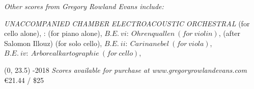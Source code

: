 \documentclass[10pt]{article}
\begin{document}
\begin{center}
\textit{\fontsize{.7cm}{1em}\selectfont Other scores from Gregory Rowland Evans include:} \hfill
\end{center}
\vspace*{4\baselineskip}
{
\begin{center}
\begin{paracol}{4}
\textit{\fontsize{.5cm}{1em}\selectfont UNACCOMPANIED}
\switchcolumn
\textit{\fontsize{.5cm}{1em}\selectfont CHAMBER}
\switchcolumn
\textit{\fontsize{.5cm}{1em}\selectfont ELECTROACOUSTIC}
\switchcolumn
\textit{\fontsize{.5cm}{1em}\selectfont ORCHESTRAL}
\switchcolumn
{} (for cello alone),
\switchcolumn
{}
\switchcolumn
{}:
\switchcolumn
{}
\switchcolumn
{} (for piano alone),
\switchcolumn
\switchcolumn
$B.E. \ vi: \ Ohrenquallen \ (for \ violin)$,
\switchcolumn
{} (after Salomon Illouz)
\switchcolumn
  (for solo cello),
 \switchcolumn
 \switchcolumn
$B.E. \ ii: \ Carinanebel \ (for \ viola)$,
\switchcolumn
\switchcolumn
\switchcolumn
\switchcolumn
$B.E. \ iv: \ Arborealkartographie \ (for \ cello)$,

\end{paracol}
\end{center}
}

\begin{textblock}{23}(0, 23.5)
-2018 \hfill
\textit{Scores available for purchase at www.gregoryrowlandevans.com} \hfill
\euro 21.44 / \$25
\end{textblock}
\end{document}
